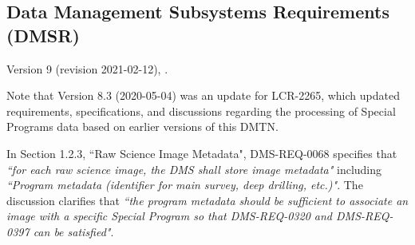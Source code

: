 {{%





\subsection{Data Management Subsystems Requirements (DMSR)}

Version 9 (revision 2021-02-12), . 

Note that Version 8.3 (2020-05-04) was an update for LCR-2265, which updated requirements, specifications, and discussions regarding the processing of Special Programs data based on earlier versions of this DMTN.

In Section 1.2.3, ``Raw Science Image Metadata", DMS-REQ-0068 specifies that {\it ``for each raw science image, the DMS shall store image metadata"} including {\it ``Program metadata (identifier for main survey, deep drilling, etc.)"}.
The discussion clarifies that {\it ``the program metadata should be sufficient to associate an image with a specific Special Program so that DMS-REQ-0320 and DMS-REQ-0397 can be satisfied"}.

}}
